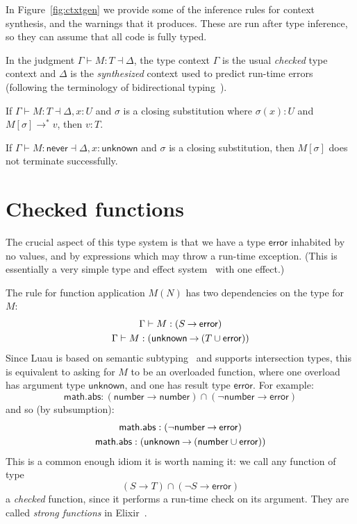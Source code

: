 \documentclass[sigplan]{acmart}
\newcommand{\NEVER}{\mathsf{never}}
\newcommand{\ERROR}{\mathsf{error}}
\newcommand{\UNKNOWN}{\mathsf{unknown}}
\newcommand{\NUMBER}{\mathsf{number}}
\newcommand{\MATH}{\mathsf{math}}
\newcommand{\ABS}{\mathsf{abs}}
\newcommand{\fun}{\mathbin{\rightarrow}}
\begin{document}
In Figure~\ref{fig:ctxtgen} we provide some of the inference rules for
context synthesis, and the warnings that it
produces.  These are run after type inference, so they can assume that
all code is fully typed.

In the judgment $\Gamma \vdash M : T \dashv
\Delta$, the type context $\Gamma$ is the usual \emph{checked} type
context and $\Delta$ is the \emph{synthesized} context used to predict
run-time errors (following the terminology of bidirectional
typing~\cite{BidirectionalTyping}).

\begin{conjecture}\label{conj:complete}%
If $\Gamma \vdash M : T \dashv \Delta, x:U$ and $\sigma$ is a closing
substitution where $\sigma(x) : U$ and $M[\sigma] \rightarrow^* v$,
then $v : T$.
\end{conjecture}

\begin{corollary}\label{cor:complete}%
If $\Gamma \vdash M : \NEVER \dashv \Delta, x:\UNKNOWN$ and $\sigma$ is a closing
substitution, then $M[\sigma]$ does not terminate successfully.
\end{corollary}

\section{Checked functions}

The crucial aspect of this type system is that we have a type $\ERROR$
inhabited by no values, and by expressions which may throw a run-time exception.
(This is essentially a very simple type and effect system~\cite{Nielson1999}
with one effect.)

The rule for function application $M(N)$
has two dependencies on the type for $M$:
\[\begin{array}{c}
  \Gamma \vdash M : (S \fun \ERROR)
  \\[\jot]
  \Gamma \vdash M : (\UNKNOWN \fun (T \cup \ERROR))
\end{array}\]
Since Luau is based on semantic subtyping~\cite{GF05:GentleIntroduction,Jef22:SemanticSubtyping} and supports
intersection types, this is equivalent to asking for $M$ to be an
overloaded function, where one overload has argument type $\UNKNOWN$, and
one has result type $\ERROR$. For example:
\[
  \MATH.\ABS : (\NUMBER \fun \NUMBER) \cap (\neg\NUMBER \fun \ERROR)
\]
and so (by subsumption):
\[\begin{array}{c}
  \MATH.\ABS : (\neg\NUMBER \fun \ERROR)
  \\[\jot]
  \MATH.\ABS : (\UNKNOWN \fun (\NUMBER \cup \ERROR))
\end{array}\]
This is a common enough idiom it is worth naming it:
we call any function of type 
\[
  (S \fun T) \cap (\neg S \fun \ERROR)
\]
a \emph{checked} function, since it performs a run-time check
on its argument. They are called \emph{strong functions}
in Elixir~\cite{DesignElixir}.
\end{document}
